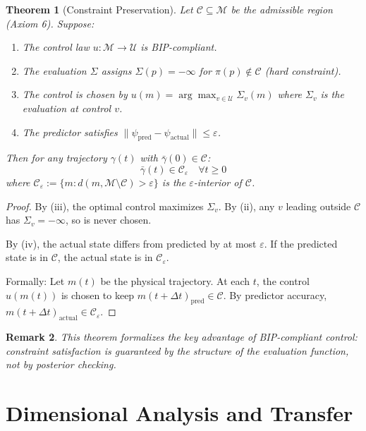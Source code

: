 \documentclass[11pt]{article}
\newtheorem{theorem}{Theorem}[section]
\newtheorem{remark}[theorem]{Remark}
\begin{document}
\begin{theorem}[Constraint Preservation]
\label{thm:constraint}
Let $\mathcal{C} \subseteq \mathcal{M}$ be the admissible region (Axiom 6).
Suppose:
\begin{enumerate}
    \item[(i)] The control law $u : \mathcal{M} \to \mathcal{U}$ is BIP-compliant.
    \item[(ii)] The evaluation $\Sigma$ assigns $\Sigma(p) = -\infty$ for $\pi(p) \notin \mathcal{C}$ (hard constraint).
    \item[(iii)] The control is chosen by $u(m) = \arg\max_{v \in \mathcal{U}} \Sigma_v(m)$ where $\Sigma_v$ is the evaluation at control $v$.
    \item[(iv)] The predictor satisfies $\|\psi_{\mathrm{pred}} - \psi_{\mathrm{actual}}\| \leq \varepsilon$.
\end{enumerate}
Then for any trajectory $\gamma(t)$ with $\bar{\gamma}(0) \in \mathcal{C}$:
\[
\bar{\gamma}(t) \in \mathcal{C}_\varepsilon \quad \forall t \geq 0
\]
where $\mathcal{C}_\varepsilon := \{m : d(m, \mathcal{M} \setminus \mathcal{C}) > \varepsilon\}$ is the $\varepsilon$-interior of $\mathcal{C}$.
\end{theorem}

\begin{proof}
By (iii), the optimal control maximizes $\Sigma_v$. By (ii), any $v$ leading outside $\mathcal{C}$ has $\Sigma_v = -\infty$,
so is never chosen.

By (iv), the actual state differs from predicted by at most $\varepsilon$. If the predicted state is in $\mathcal{C}$,
the actual state is in $\mathcal{C}_\varepsilon$.

Formally: Let $m(t)$ be the physical trajectory. At each $t$, the control $u(m(t))$ is chosen to
keep $m(t + \Delta t)_{\mathrm{pred}} \in \mathcal{C}$. By predictor accuracy, $m(t + \Delta t)_{\mathrm{actual}} \in \mathcal{C}_\varepsilon$.
\end{proof}

\begin{remark}
This theorem formalizes the key advantage of BIP-compliant control: constraint
satisfaction is guaranteed by the structure of the evaluation function, not by posterior checking.
\end{remark}

\section{Dimensional Analysis and Transfer}
\end{document}
